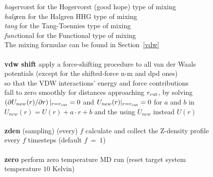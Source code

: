 \begin{tabbing}
\>                                              \> \phantom{x} {\em hoge}rvorst for the Hogervorst (good hope) type of mixing \\
\>                                              \> \phantom{x} {\em halg}ren for the Halgren HHG type of mixing \\
\>                                              \> \phantom{x} {\em tang} for the Tang-Toennies type of mixing \\
\>                                              \> \phantom{x} {\em func}tional for the Functional type of mixing \\
\>                                              \> The mixing formulae can be found in Section~\ref{vdw} \\
\>                                              \> \\
\> {\bf vdw shift}                              \> apply a force-shifting procedure to all van der Waals \\
\>                                              \> potentials (except for the shifted-force n-m and dpd ones) \\
\>                                              \> so that the VDW interactions' energy and force contributions \\
\>                                              \> fall to zero smoothly for distances approaching $r_{\rm cut}$, by solving \\
\>                                              \> $\left(\partial U_{new}(r) / \partial r \right)|_{r = r_{\rm cut}} = 0$ and $U_{new}(r)|_{r=r_{\rm cut}}= 0$ for $a$ and $b$ in \\
\>                                              \> $U_{new}(r) = U(r) + a \cdot r + b$ and the using $U_{new}$ instead $U(r)$ \\
\>                                              \> \\
\> {\bf zden} (sampling) (every) $f$            \> calculate and collect the Z-density profile \\
\>                                              \> every $f$ timesteps (default $f~=~1$) \\
\>                                              \> \\
\> {\bf zero}                                   \> perform zero temperature MD run (reset target system \\
\>                                              \> temperature $10$ Kelvin) \\

\end{tabbing}
